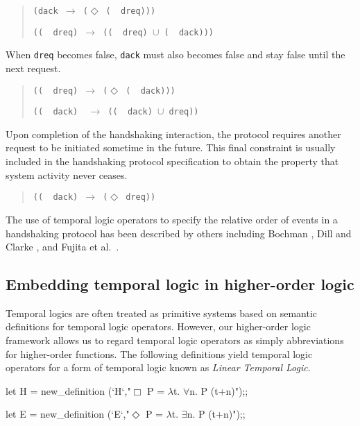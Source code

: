 \begin{quote}
\verb"(dack "$\longrightarrow$\verb" ("$\Diamond$\verb" ("{\TLNot}\verb"  dreq)))"

\verb"(("{\TLNot}\verb"  dreq) "$\longrightarrow$\verb" (("{\TLNot}\verb"  dreq) "$\cup$\verb" ("{\TLNot}\verb"  dack)))"
\end{quote}

When \verb"dreq" becomes false, \verb"dack" must
also becomes false and stay false until the next request.

\begin{quote}
\verb"(("{\TLNot}\verb"  dreq) "$\longrightarrow$\verb" ("$\Diamond$\verb" ("{\TLNot}\verb"  dack)))"

\verb"(("{\TLNot}\verb"  dack)  "$\longrightarrow$\verb" (("{\TLNot}\verb"  dack) "$\cup$\verb" dreq))"
\end{quote}

Upon completion of the handshaking interaction,
the protocol requires another request to be initiated
sometime in the future.
This final constraint is usually included in the
handshaking protocol specification
to obtain the property that system activity never ceases.

\begin{quote}
\verb"(("{\TLNot}\verb"  dack) "$\longrightarrow$\verb" ("$\Diamond$\verb" dreq))"
\end{quote}

The use of temporal logic operators to specify the relative order
of events in a handshaking protocol
has been described by others including
Bochman \cite{Bochman},
Dill and Clarke \cite{Clarke},
and Fujita et al.\ \cite{Fujita}.

\subsection{Embedding temporal logic in higher-order logic}

Temporal logics are often treated as primitive systems
based on semantic definitions for temporal logic operators.
However, our higher-order logic framework allows us to regard
temporal logic operators
as simply abbreviations for higher-order functions.
The following definitions yield temporal logic operators
for a form of temporal logic known as {\it Linear Temporal Logic}.

\begintt
let H = new_definition (`H`,"\(\Box\) P = \(\lambda\)t. \(\forall\)n. P (t+n)");;

let E = new_definition (`E`,"\(\Diamond\) P = \(\lambda\)t. \(\exists\)n. P (t+n)");;

